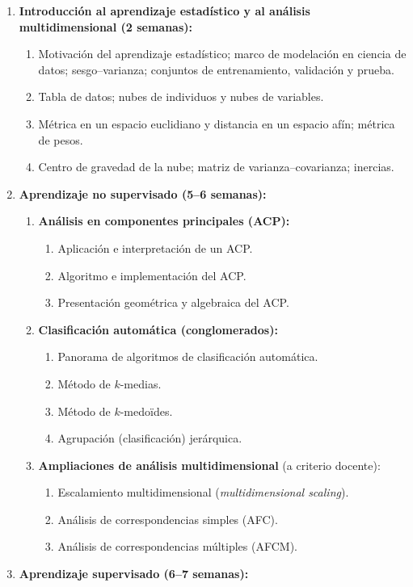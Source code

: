 \begin{refsection}
\begin{enumerate}
\item \textbf{Introducción al aprendizaje estadístico y al análisis multidimensional (2 semanas):}
\begin{enumerate}
\item Motivación del aprendizaje estadístico; marco de modelación en ciencia de datos; sesgo--varianza; conjuntos de entrenamiento, validación y prueba.
\item Tabla de datos; nubes de individuos y nubes de variables.
\item Métrica en un espacio euclidiano y distancia en un espacio afín; métrica de pesos.
\item Centro de gravedad de la nube; matriz de varianza--covarianza; inercias.
\end{enumerate}
\item \textbf{Aprendizaje no supervisado (5--6 semanas):}
\begin{enumerate}
\item \textbf{Análisis en componentes principales (ACP):}
\begin{enumerate}
\item Aplicación e interpretación de un ACP.
\item Algoritmo e implementación del ACP.
\item Presentación geométrica y algebraica del ACP.
\end{enumerate}
\item \textbf{Clasificación automática (conglomerados):}
\begin{enumerate}
\item Panorama de algoritmos de clasificación automática.
\item Método de $k$-medias.
\item Método de $k$-medoïdes.
\item Agrupación (clasificación) jerárquica.
\end{enumerate}
\item \textbf{Ampliaciones de análisis multidimensional} (a criterio docente):
\begin{enumerate}
\item Escalamiento multidimensional (\emph{multidimensional scaling}).
\item Análisis de correspondencias simples (AFC).
\item Análisis de correspondencias múltiples (AFCM).
\end{enumerate}
\end{enumerate}
\item \textbf{Aprendizaje supervisado (6--7 semanas):}

\end{enumerate}
\end{refsection}
